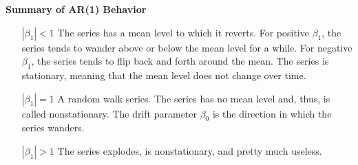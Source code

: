 \documentclass[12pt,xcolor=svgnames]{beamer}
\newcommand{\sk}{\vspace{.5cm}}
\begin{document}

\begin{frame}

{\bf Summary of AR(1) Behavior}\sk

\small
\begin{itemize}
\item [$|\beta_1| < 1$]
The series has a mean level to which it reverts.  For 
positive $\beta_1$, the series tends to wander above or below 
the mean level for a while.  For negative $\beta_1$, the series 
tends to flip back and forth around the mean. 
The series is stationary, meaning that the 
mean level does not change over time.  
\item [$|\beta_1| = 1$] A random walk series.
The series has no mean level and, thus, is called 
nonstationary.  The drift parameter $\beta_0$ is the direction in 
which the series wanders.
\item [$|\beta_1| > 1$] 
The series explodes, is nonstationary, and pretty much useless.
\end{itemize}
\end{frame}
\end{document}
